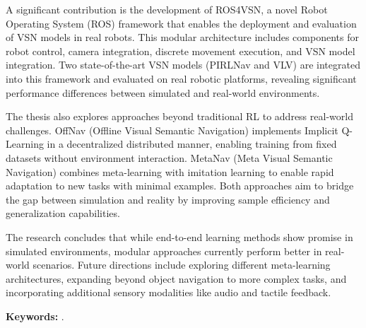 A significant contribution is the development of ROS4VSN, a novel Robot Operating System (ROS) framework that enables the deployment and evaluation of VSN models in real robots.
This modular architecture includes components for robot control, camera integration, discrete movement execution, and VSN model integration.
Two state-of-the-art VSN models (PIRLNav and VLV) are integrated into this framework and evaluated on real robotic platforms, revealing significant performance differences between simulated and real-world environments.

The thesis also explores approaches beyond traditional RL to address real-world challenges.
OffNav (Offline Visual Semantic Navigation) implements Implicit Q-Learning in a decentralized distributed manner, enabling training from fixed datasets without environment interaction.
MetaNav (Meta Visual Semantic Navigation) combines meta-learning with imitation learning to enable rapid adaptation to new tasks with minimal examples.
Both approaches aim to bridge the gap between simulation and reality by improving sample efficiency and generalization capabilities.

The research concludes that while end-to-end learning methods show promise in simulated environments, modular approaches currently perform better in real-world scenarios.
Future directions include exploring different meta-learning architectures, expanding beyond object navigation to more complex tasks, and incorporating additional sensory modalities like audio and tactile feedback.

\textbf{Keywords:} \myThesisKeywordsEnglish.



